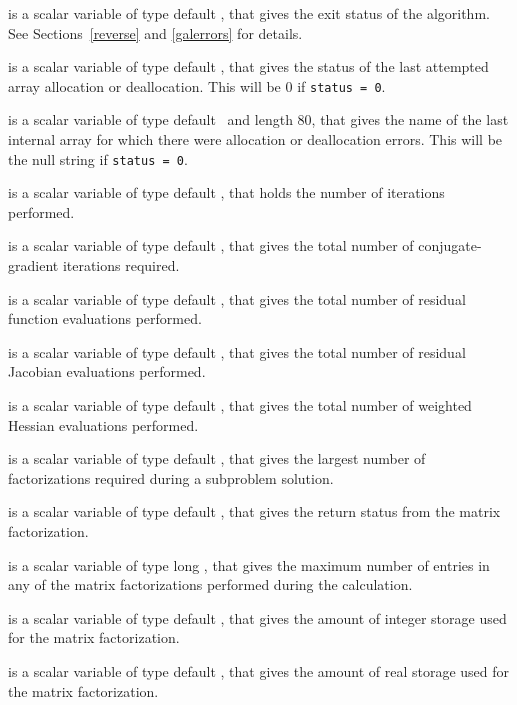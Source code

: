 \documentclass{galahad}
\begin{document}
\begin{description}
 is a scalar variable of type default \integer, that gives the
exit status of the algorithm.
See Sections~\ref{reverse} and \ref{galerrors}
for details.

 is a scalar variable of type default \integer, that gives
the status of the last attempted array allocation or deallocation.
This will be 0 if {\tt status = 0}.

 is a scalar variable of type default \character\
and length 80, that  gives the name of the last internal array
for which there were allocation or deallocation errors.
This will be the null string if {\tt status = 0}.

 is a scalar variable of type default \integer, that holds the
number of iterations performed.

 is a scalar variable of type default \integer, that gives the
total number of conjugate-gradient iterations required.

 is a scalar variable of type default \integer, that gives the
total number of residual function evaluations performed.

 is a scalar variable of type default \integer, that gives the
total number of residual Jacobian evaluations performed.

 is a scalar variable of type default \integer, that gives the
total number of weighted Hessian evaluations performed.

 is a scalar variable of type default \integer, that
gives the largest number of factorizations required during a subproblem
solution.

 is a scalar variable of type default \integer, that
gives the return status from the matrix factorization.

 is a scalar variable of type long \integer, that
gives the maximum number of entries in any of the matrix factorizations
performed during the calculation.

 is a scalar variable of type default
\integer, that gives the amount of integer storage used for the matrix
factorization.

 is a scalar variable of type default \integer,
that gives the amount of real storage used for the matrix factorization.


\end{description}
\end{document}
